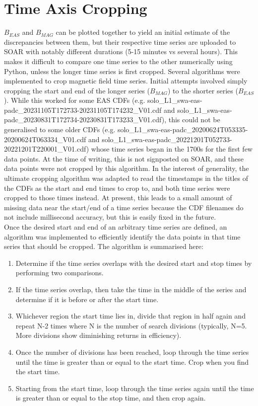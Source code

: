 \section{Time Axis Cropping}
\(B_{EAS}\) and \(B_{MAG}\) can be plotted together to yield an initial estimate of the discrepancies between them, but their respective time series are uploaded to SOAR with notably different durations (5-15 minutes vs several hours). This makes it difficult to compare one time series to the other numerically using Python, unless the longer time series is first cropped.  Several algorithms were implemented to crop magnetic field time series. Initial attempts involved simply cropping the start and end of the longer series  (\(B_{MAG}\)) to the shorter series (\(B_{EAS}\)). While this worked for some EAS CDFs (e.g. solo\_L1\_swa-eas-padc\_20231105T172733-20231105T174232\_V01.cdf and solo\_L1\_swa-eas-padc\_20230831T172734-20230831T173233\_V01.cdf), this could not be generalised to some older CDFs (e.g. solo\_L1\_swa-eas-padc\_20200624T053335-20200624T063334\_V01.cdf and solo\_L1\_swa-eas-padc\_20221201T052733-20221201T220001\_V01.cdf) whose time series began in the 1700s for the first few data points. At the time of writing, this is not signposted on SOAR, and these data points were not cropped by this algorithm. In the interest of generality, the ultimate cropping algorithm was adapted to read the timestamps in the titles of the CDFs as the start and end times to crop to, and both time series were cropped to those times instead. At present, this leads to a small amount of missing data near the start/end of a time series because the CDF filenames do not include millisecond accuracy, but this is easily fixed in the future.
\\

Once the desired start and end of an arbitrary time series are defined, an algorithm was implemented to efficiently identify the data points in that time series that should be cropped. The algorithm is summarised here:
\begin{enumerate}
    \item Determine if the time series overlaps with the desired start and stop times by performing two comparisons.
    \item If the time series overlap, then take the time in the middle of the series and determine if it is before or after the start time. 
    \item Whichever region the start time lies in, divide that region in half again and repeat N-2 times where N is the number of search divisions (typically, N=5. More divisions show diminishing returns in efficiency).
    \item Once the number of divisions has been reached, loop through the time series until the time is greater than or equal to the start time. Crop when you find the start time.
    \item Starting from the start time, loop through the time series again until the time is greater than or equal to the stop time, and then crop again.
\end{enumerate}

